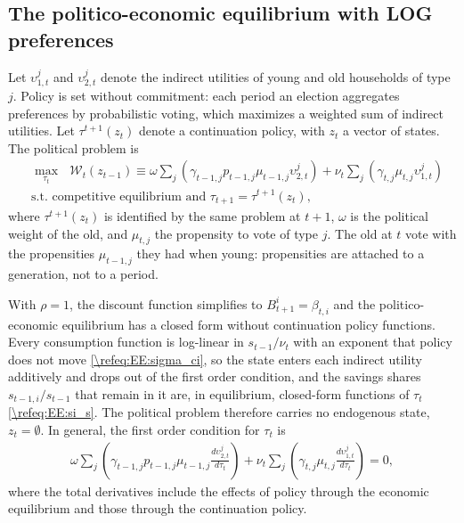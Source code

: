 \subsection{The politico-economic equilibrium with LOG preferences}\label{\refsec:PEELOG}
Let $\upsilon_{1,t}^j$ and $\upsilon_{2,t}^j$ denote the indirect utilities of young and old households of type $j$. Policy is set without commitment: each period an election aggregates preferences by probabilistic voting, which maximizes a weighted sum of indirect utilities. Let $\tau^{t+1}(z_t)$ denote a continuation policy, with $z_t$ a vector of states. The political problem is
\begin{align*}
    &\max_{\tau_t}\mbox{ }\mathcal{W}_t(z_{t-1}) \equiv \omega\sum_j\left(\gamma_{t-1,j} p_{t-1,j} \mu_{t-1,j} \upsilon_{2,t}^j\right)+\nu_t\sum_j\left(\gamma_{t,j}\mu_{t,j} \upsilon_{1,t}^j\right) \\
    &\text{s.t. competitive equilibrium and }\tau_{t+1} = \tau^{t+1}(z_t),
\end{align*}
where $\tau^{t+1}(z_t)$ is identified by the same problem at $t+1$, $\omega$ is the political weight of the old, and $\mu_{t,j}$ the propensity to vote of type $j$. The old at $t$ vote with the propensities $\mu_{t-1,j}$ they had when young: propensities are attached to a generation, not to a period.

With $\rho = 1$, the discount function simplifies to $B_{t+1}^i = \beta_{t,i}$ and the politico-economic equilibrium has a closed form without continuation policy functions. Every consumption function is log-linear in $s_{t-1}/\nu_t$ with an exponent that policy does not move \eqref{\refeq:EE:sigma_ci}, so the state enters each indirect utility additively and drops out of the first order condition, and the savings shares $s_{t-1,i}/s_{t-1}$ that remain in it are, in equilibrium, closed-form functions of $\tau_t$ \eqref{\refeq:EE:si_s}. The political problem therefore carries no endogenous state, $z_t = \emptyset$. In general, the first order condition for $\tau_t$ is
\begin{align*}
    \omega\sum_{j}\left(\gamma_{t-1,j}p_{t-1,j}\mu_{t-1,j} \frac{d\upsilon_{2,t}^j}{d\tau_t}\right)+
    \nu_t\sum_j\left(\gamma_{t,j}\mu_{t,j} \frac{d\upsilon_{1,t}^j}{d\tau_t}\right) = 0,
\end{align*}
where the total derivatives include the effects of policy through the economic equilibrium and those through the continuation policy.

